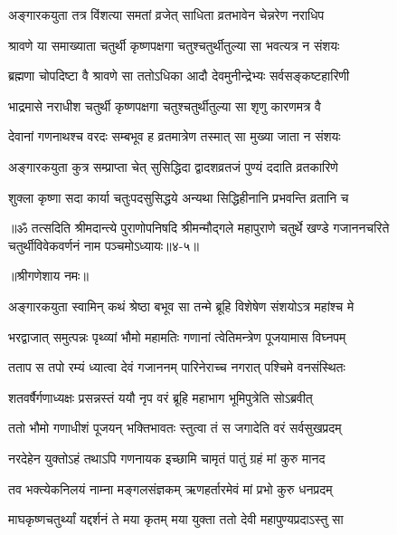 \twolineshloka
{अङ्गारकयुता तत्र विंशत्या समतां व्रजेत्}
{साधिता व्रतभावेन चेन्नरेण नराधिप} %

\twolineshloka
{श्रावणे या समाख्याता चतुर्थी कृष्णपक्षगा}
{चतुश्चतुर्थीतुल्या सा भवत्यत्र न संशयः} %

\twolineshloka
{ब्रह्मणा चोपदिष्टा वै श्रावणे सा ततोऽधिका}
{आदौ देवमुनीन्द्रेभ्यः सर्वसङ्कष्टहारिणी} %

\twolineshloka
{भाद्रमासे नराधीश चतुर्थी कृष्णपक्षगा}
{चतुश्चतुर्थीतुल्या सा श‍ृणु कारणमत्र वै} %

\twolineshloka
{देवानां गणनाथश्च वरदः सम्बभूव ह}
{व्रतमात्रेण तस्मात् सा मुख्या जाता न संशयः} %

\twolineshloka
{अङ्गारकयुता कुत्र सम्प्राप्ता चेत् सुसिद्धिदा}
{द्वादशव्रतजं पुण्यं ददाति व्रतकारिणे} %

\twolineshloka
{शुक्ला कृष्णा सदा कार्या चतुःपदसुसिद्धये}
{अन्यथा सिद्धिहीनानि प्रभवन्ति व्रतानि च} %

॥ॐ तत्सदिति श्रीमदान्त्ये पुराणोपनिषदि श्रीमन्मौद्गले महापुराणे चतुर्थे खण्डे गजाननचरिते चतुर्थीविवेकवर्णनं नाम पञ्चमोऽध्यायः॥४-५॥


\label{sec:chandradarshana-dosha-harana-charita-varnanam}

\centerline{॥श्रीगणेशाय नमः॥}


\twolineshloka
{अङ्गारकयुता स्वामिन् कथं श्रेष्ठा बभूव सा}
{तन्मे ब्रूहि विशेषेण संशयोऽत्र महांश्च मे} %


\twolineshloka
{भरद्वाजात् समुत्पन्नः पृथ्व्यां भौमो महामतिः}
{गणानां त्वेतिमन्त्रेण पूजयामास विघ्नपम्} %

\twolineshloka
{तताप स तपो रम्यं ध्यात्वा देवं गजाननम्}
{पारिनेराच्च नगरात् पश्चिमे वनसंस्थितः} %

\twolineshloka
{शतवर्षैर्गणाध्यक्षः प्रसन्नस्तं ययौ नृप}
{वरं ब्रूहि महाभाग भूमिपुत्रेति सोऽब्रवीत्} %

\twolineshloka
{ततो भौमो गणाधीशं पूजयन् भक्तिभावतः}
{स्तुत्वा तं स जगादेति वरं सर्वसुखप्रदम्} %

\twolineshloka
{नरदेहेन युक्तोऽहं तथाऽपि गणनायक}
{इच्छामि चामृतं पातुं ग्रहं मां कुरु मानद} %

\twolineshloka
{तव भक्त्येकनिलयं नाम्ना मङ्गलसंज्ञकम्}
{ऋणहर्तारमेवं मां प्रभो कुरु धनप्रदम्} %

\twolineshloka
{माघकृष्णचतुर्थ्यां यद्दर्शनं ते मया कृतम्}
{मया युक्ता ततो देवी महापुण्यप्रदाऽस्तु सा} %

